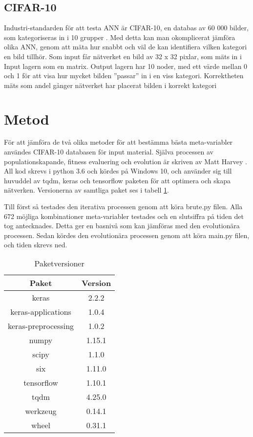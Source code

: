 \documentclass[a4paper, 11pt]{article}
\begin{document}
    \subsection{CIFAR-10}
    Industri-standarden för att testa ANN är CIFAR-10, en databas av 60 000 bilder, som kategoriseras in i 10 grupper \parencite{krizhevsky2014cifar}. Med detta kan man okomplicerat jämföra olika ANN, genom att mäta hur snabbt och väl de kan identifiera vilken kategori en bild tillhör. Som input får nätverket en bild av 32 x 32 pixlar, som mäts in i Input lagern som en matrix. Output lagern har 10 noder, med ett värde mellan 0 och 1 för att visa hur mycket bilden ”passar” in i en viss kategori. Korrektheten mäts som andel gånger nätverket har placerat bilden i korrekt kategori

  \section{Metod}
  För att jämföra de två olika metoder för att bestämma bästa meta-variabler användes CIFAR-10 databasen för input material. Själva processen av populationskapande, fitness evaluering och evolution är skriven av Matt Harvey \parencite{harvey2017}. All kod skrevs i python 3.6 och kördes på Windows 10, och använder sig till huvuddel av tqdm, keras och tensorflow paketen för att optimera och skapa nätverken. Versionerna av samtliga paket ses i tabell \ref{paketversioner}.

  Till först så testades den iterativa processen genom att köra brute.py filen. Alla 672 möjliga kombinationer meta-variabler testades och en slutsiffra på tiden det tog antecknades. Detta ger en basnivå som kan jämföras med den evolutionära processen. Sedan kördes den evolutionära processen genom att köra main.py filen, och tiden skrevs ned.

  \begin{table}
    \centering
    \begin{tabular}{c|c}
      Paket & Version \\
      \hline
      keras & 2.2.2 \\
      keras-applications & 1.0.4 \\
      keras-preprocessing & 1.0.2 \\
      numpy & 1.15.1 \\
      scipy & 1.1.0 \\
      six & 1.11.0 \\
      tensorflow & 1.10.1 \\
      tqdm & 4.25.0 \\
      werkzeug & 0.14.1 \\
      wheel & 0.31.1
    \end{tabular}
    \caption{Paketversioner}
    \label{paketversioner}
  \end{table}
\end{document}

